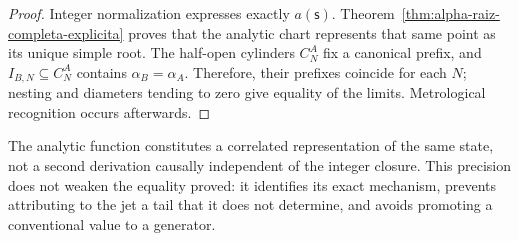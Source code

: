 \begin{proof}
Integer normalization expresses exactly \(a(\mathsf s)\).
Theorem~\ref{thm:alpha-raiz-completa-explicita} proves that the analytic
chart represents that same point as its unique simple root. The
half-open cylinders \(C_N^A\) fix a canonical prefix, and
\(I_{B,N}\subseteq C_N^A\) contains \(\alpha_B=\alpha_A\). Therefore, their
prefixes coincide for each \(N\); nesting and diameters tending to
zero give equality of the limits. Metrological
recognition occurs afterwards.
\end{proof}

The analytic function constitutes a correlated representation of the same
state, not a second derivation causally independent of the integer
closure. This precision does not weaken the equality proved: it identifies its
exact mechanism, prevents attributing to the jet a tail that it does not determine, and avoids
promoting a conventional value to a generator.
